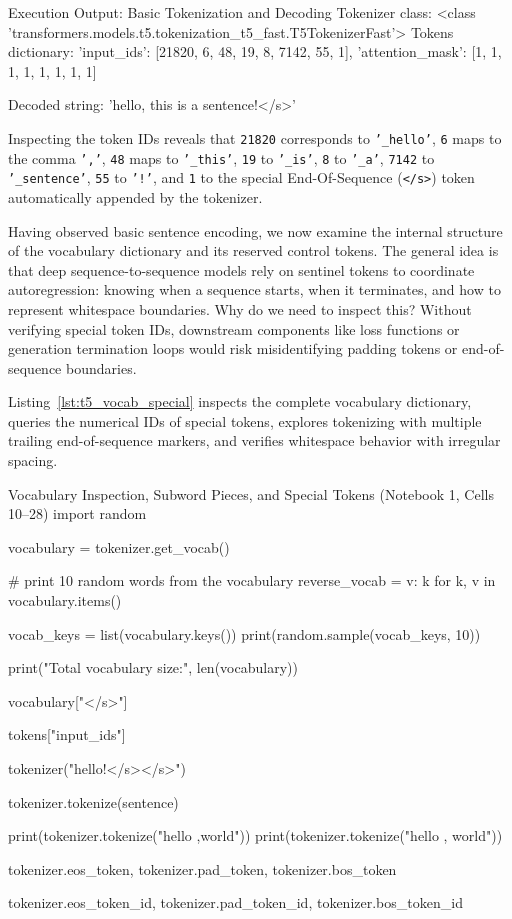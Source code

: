 \documentclass[11pt,a4paper]{article}
\begin{document}
\begin{macterminal}{Execution Output: Basic Tokenization and Decoding}
Tokenizer class: <class 'transformers.models.t5.tokenization_t5_fast.T5TokenizerFast'>
Tokens dictionary:
{'input_ids': [21820, 6, 48, 19, 8, 7142, 55, 1], 'attention_mask': [1, 1, 1, 1, 1, 1, 1, 1]}

Decoded string:
'hello, this is a sentence!</s>'
\end{macterminal}

Inspecting the token IDs reveals that \texttt{21820} corresponds to \texttt{'\_hello'}, \texttt{6} maps to the comma \texttt{','}, \texttt{48} maps to \texttt{'\_this'}, \texttt{19} to \texttt{'\_is'}, \texttt{8} to \texttt{'\_a'}, \texttt{7142} to \texttt{'\_sentence'}, \texttt{55} to \texttt{'!'}, and \texttt{1} to the special End-Of-Sequence (\texttt{</s>}) token automatically appended by the tokenizer.

Having observed basic sentence encoding, we now examine the internal structure of the vocabulary dictionary and its reserved control tokens. The general idea is that deep sequence-to-sequence models rely on sentinel tokens to coordinate autoregression: knowing when a sequence starts, when it terminates, and how to represent whitespace boundaries. Why do we need to inspect this? Without verifying special token IDs, downstream components like loss functions or generation termination loops would risk misidentifying padding tokens or end-of-sequence boundaries.

Listing~\ref{lst:t5_vocab_special} inspects the complete vocabulary dictionary, queries the numerical IDs of special tokens, explores tokenizing with multiple trailing end-of-sequence markers, and verifies whitespace behavior with irregular spacing.

\begin{solutioncode}[label=lst:t5_vocab_special]{Vocabulary Inspection, Subword Pieces, and Special Tokens (Notebook 1, Cells 10--28)}
import random 

vocabulary = tokenizer.get_vocab()

# print 10 random words from the vocabulary
reverse_vocab = {v: k for k, v in vocabulary.items()}

vocab_keys = list(vocabulary.keys())
print(random.sample(vocab_keys, 10))

print("Total vocabulary size:", len(vocabulary))

vocabulary["</s>"]

tokens["input_ids"]

tokenizer("hello!</s></s>")

tokenizer.tokenize(sentence)

print(tokenizer.tokenize("hello    ,world"))
print(tokenizer.tokenize("hello    , world"))

tokenizer.eos_token, tokenizer.pad_token, tokenizer.bos_token

tokenizer.eos_token_id, tokenizer.pad_token_id, tokenizer.bos_token_id
\end{solutioncode}
\end{document}

